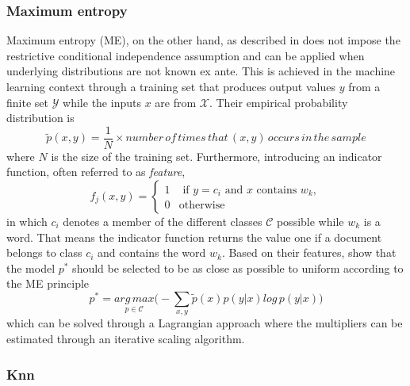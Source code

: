 \subsubsection{Maximum entropy} %
Maximum entropy (ME), on the other hand, as described in \textcite{Berger.1996} does not impose the restrictive conditional independence assumption and can be applied when underlying distributions are not known ex ante. 
This is achieved in the machine learning context through a training set that produces output values $y$ from a finite set $\mathcal{Y}$ while the inputs $x$ are from $\mathcal{X}$. Their empirical probability distribution is
%
\begin{equation*}
	\tilde{p}(x,y) = \frac{1}{N}\times number\, of\, times\, that\, (x,y)\, occurs\, in\, the\, sample
\end{equation*}
%
where $N$ is the size of the training set. Furthermore, introducing an indicator function, often referred to as \textit{feature},
%
\begin{equation*}
	f_j(x,y) = 
				\begin{cases}
					1 &\text{ if } y = c_i \text{ and $x$ contains $w_k$},\\
					0 & \text{otherwise }
				\end{cases}
\end{equation*}
%
in which $c_i$ denotes a member of the different classes $\mathcal{C}$ possible while $w_k$ is a word. That means the indicator function returns the value one if a document belongs to class $c_i$ and contains the word $w_k$. Based on their features, \textcite{Berger.1996} show that the model $p^*$ should be selected to be as close as possible to uniform according to the ME principle
%
\begin{equation}
	p^* = \underset{p\in \mathcal{C}}{arg\, max} \big(-\sum_{x,y}\tilde{p}(x)p(y|x)log\, p(y|x)\big)
\end{equation}
%
which can be solved through a Lagrangian approach where the multipliers can be estimated through an iterative scaling algorithm.

%
\subsubsection{Knn} %

